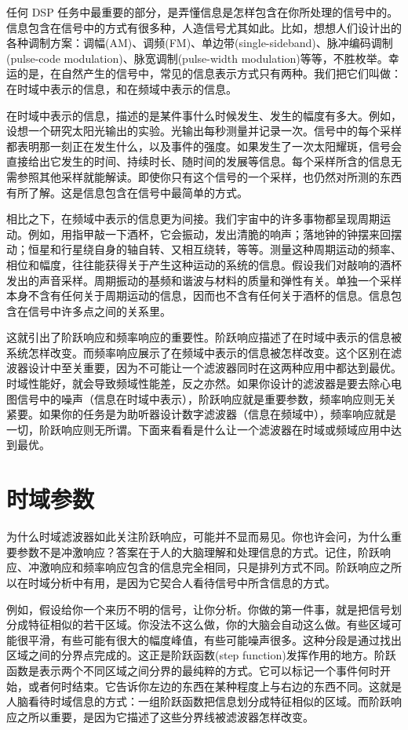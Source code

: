 任何 DSP
任务中最重要的部分，是弄懂信息是怎样包含在你所处理的信号中的。信息包含在信号中的方式有很多种，人造信号尤其如此。比如，想想人们设计出的各种调制方案：调幅(AM)、调频(FM)、单边带(single-sideband)、脉冲编码调制(pulse-code
modulation)、脉宽调制(pulse-width
modulation)等等，不胜枚举。幸运的是，在自然产生的信号中，常见的信息表示方式只有两种。我们把它们叫做：在时域中表示的信息，和在频域中表示的信息。

在时域中表示的信息，描述的是某件事什么时候发生、发生的幅度有多大。例如，设想一个研究太阳光输出的实验。光输出每秒测量并记录一次。信号中的每个采样都表明那一刻正在发生什么，以及事件的强度。如果发生了一次太阳耀斑，信号会直接给出它发生的时间、持续时长、随时间的发展等信息。每个采样所含的信息无需参照其他采样就能解读。即使你只有这个信号的一个采样，也仍然对所测的东西有所了解。这是信息包含在信号中最简单的方式。

相比之下，在频域中表示的信息更为间接。我们宇宙中的许多事物都呈现周期运动。例如，用指甲敲一下酒杯，它会振动，发出清脆的响声；落地钟的钟摆来回摆动；恒星和行星绕自身的轴自转、又相互绕转，等等。测量这种周期运动的频率、相位和幅度，往往能获得关于产生这种运动的系统的信息。假设我们对敲响的酒杯发出的声音采样。周期振动的基频和谐波与材料的质量和弹性有关。单独一个采样本身不含有任何关于周期运动的信息，因而也不含有任何关于酒杯的信息。信息包含在信号中许多点之间的关系里。

这就引出了阶跃响应和频率响应的重要性。阶跃响应描述了在时域中表示的信息被系统怎样改变。而频率响应展示了在频域中表示的信息被怎样改变。这个区别在滤波器设计中至关重要，因为不可能让一个滤波器同时在这两种应用中都达到最优。时域性能好，就会导致频域性能差，反之亦然。如果你设计的滤波器是要去除心电图信号中的噪声（信息在时域中表示），阶跃响应就是重要参数，频率响应则无关紧要。如果你的任务是为助听器设计数字滤波器（信息在频域中），频率响应就是一切，阶跃响应则无所谓。下面来看看是什么让一个滤波器在时域或频域应用中达到最优。

\section{时域参数}

为什么时域滤波器如此关注阶跃响应，可能并不显而易见。你也许会问，为什么重要参数不是冲激响应？答案在于人的大脑理解和处理信息的方式。记住，阶跃响应、冲激响应和频率响应包含的信息完全相同，只是排列方式不同。阶跃响应之所以在时域分析中有用，是因为它契合人看待信号中所含信息的方式。

例如，假设给你一个来历不明的信号，让你分析。你做的第一件事，就是把信号划分成特征相似的若干区域。你没法不这么做，你的大脑会自动这么做。有些区域可能很平滑，有些可能有很大的幅度峰值，有些可能噪声很多。这种分段是通过找出区域之间的分界点完成的。这正是阶跃函数(step
function)发挥作用的地方。阶跃函数是表示两个不同区域之间分界的最纯粹的方式。它可以标记一个事件何时开始，或者何时结束。它告诉你左边的东西在某种程度上与右边的东西不同。这就是人脑看待时域信息的方式：一组阶跃函数把信息划分成特征相似的区域。而阶跃响应之所以重要，是因为它描述了这些分界线被滤波器怎样改变。

